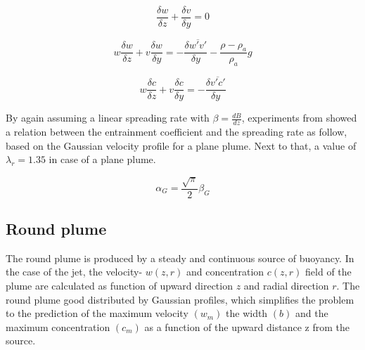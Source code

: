 \begin{equation}
    \frac{\delta w}{\delta z} + \frac{\delta v}{\delta y} = 0
\end{equation}

\begin{equation}
    w\frac{\delta w}{\delta z} + v \frac{\delta w}{\delta y} = -\frac{\delta \overline{w'v'}}{\delta y} - \frac{\rho - \rho_a}{\rho_a}g
\end{equation}

\begin{equation}
    w\frac{\delta c}{\delta z} + v\frac{\delta c}{\delta y} = - \frac{\delta \overline{v'c'}}{\delta y}
\end{equation}\newline

\noindent By again assuming a linear spreading rate with $\beta = \frac{dB}{dz}$, experiments from \cite{Kotsovinos} showed a relation between the entrainment coefficient and the spreading rate as follow, based on the Gaussian velocity profile for a plane plume. Next to that, a value of $\lambda_r = 1.35$ in case of a plane plume.

\begin{equation}
    \alpha_G = \frac{\sqrt{\pi}}{2} \beta_G
\end{equation}


\subsection{Round plume}
The round plume is produced by a steady and continuous source of buoyancy. In the case of the jet, the velocity- $w(z,r)$ and concentration $c(z,r)$ field of the plume are calculated as function of upward direction $z$ and radial direction $r$. The round plume good distributed by Gaussian profiles, which simplifies the problem to the prediction of the maximum velocity $(w_m)$ the width $(b)$ and the maximum concentration $(c_m)$ as a function of the upward distance z from the source.


